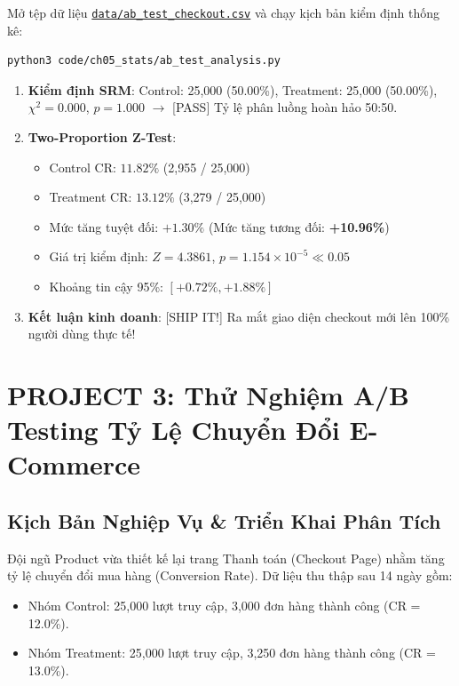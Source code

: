 \begin{handsonlabbox}
Mở tệp dữ liệu \href{run:./data/ab_test_checkout.csv}{\texttt{data/ab\_test\_checkout.csv}} và chạy kịch bản kiểm định thống kê:
\begin{lstlisting}[language=bash]
python3 code/ch05_stats/ab_test_analysis.py
\end{lstlisting}
\begin{enumerate}
    \item \textbf{Kiểm định SRM}: Control: 25,000 (50.00\%), Treatment: 25,000 (50.00\%), $\chi^2 = 0.000$, $p = 1.000$ $\rightarrow$ [PASS] Tỷ lệ phân luồng hoàn hảo 50:50.
    \item \textbf{Two-Proportion Z-Test}:
    \begin{itemize}
        \item Control CR: $11.82\%$ (2,955 / 25,000)
        \item Treatment CR: $13.12\%$ (3,279 / 25,000)
        \item Mức tăng tuyệt đối: $+1.30\%$ (Mức tăng tương đối: \textbf{+10.96\%})
        \item Giá trị kiểm định: $Z = 4.3861$, $p = 1.154 \times 10^{-5} \ll 0.05$
        \item Khoảng tin cậy 95\%: $[+0.72\%, +1.88\%]$
    \end{itemize}
    \item \textbf{Kết luận kinh doanh}: [SHIP IT!] Ra mắt giao diện checkout mới lên 100\% người dùng thực tế!
\end{enumerate}
\end{handsonlabbox}

\section{PROJECT 3: Thử Nghiệm A/B Testing Tỷ Lệ Chuyển Đổi E-Commerce}

\subsection{Kịch Bản Nghiệp Vụ \& Triển Khai Phân Tích}
Đội ngũ Product vừa thiết kế lại trang Thanh toán (Checkout Page) nhằm tăng tỷ lệ chuyển đổi mua hàng (Conversion Rate). Dữ liệu thu thập sau 14 ngày gồm:
\begin{itemize}
    \item Nhóm Control: 25,000 lượt truy cập, 3,000 đơn hàng thành công (CR = 12.0\%).
    \item Nhóm Treatment: 25,000 lượt truy cập, 3,250 đơn hàng thành công (CR = 13.0\%).
\end{itemize}


